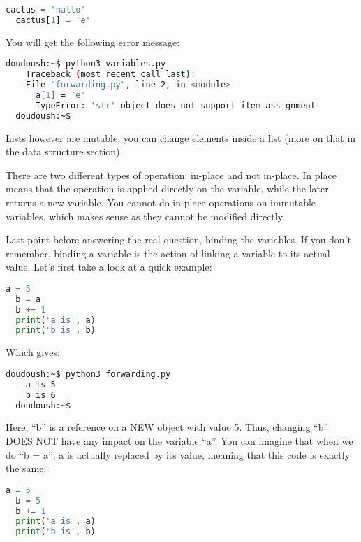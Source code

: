 \begin{lstlisting}[language=python]
  cactus = 'hallo'
  cactus[1] = 'e'
\end{lstlisting}

You will get the following error message:

\begin{lstlisting}[language=bash]
  doudoush:~$ python3 variables.py
    Traceback (most recent call last):
    File "forwarding.py", line 2, in <module>
      a[1] = 'e'
      TypeError: 'str' object does not support item assignment
  doudoush:~$
\end{lstlisting}

Lists however are mutable, you can change elements inside a list
(more on that in the data structure section).

\vspace{5mm}

There are two different types of operation: in-place and not in-place.
In place means that the operation is applied directly on the variable, while the later
returns a new variable. You cannot do in-place operations on immutable variables,
which makes sense as they cannot be modified directly.

\vspace{5mm}

Last point before answering the real question, binding the variables. If you don't
remember, binding a variable is the action of linking a variable to its actual value.
Let's first take a look at a quick example:

\begin{lstlisting}[language=python]
  a = 5
  b = a
  b += 1
  print('a is', a)
  print('b is', b)
\end{lstlisting}

Which gives:

\begin{lstlisting}[language=bash]
  doudoush:~$ python3 forwarding.py
    a is 5
    b is 6
  doudoush:~$
\end{lstlisting}

Here, ``b'' is a reference on a NEW object with value 5. Thus, changing ``b'' DOES NOT have any impact
on the variable ``a''. You can imagine that when we do ``b = a'', a is actually replaced by its value,
meaning that this code is exactly the same:

\begin{lstlisting}[language=python]
  a = 5
  b = 5
  b += 1
  print('a is', a)
  print('b is', b)
\end{lstlisting}

